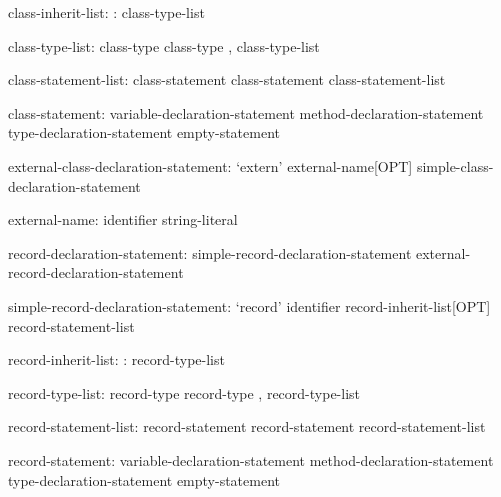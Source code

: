 \begin{syntax}
class-inherit-list:
  : class-type-list
\end{syntax}

\begin{syntax}
class-type-list:
  class-type
  class-type , class-type-list
\end{syntax}

\begin{syntax}
class-statement-list:
  class-statement
  class-statement class-statement-list
\end{syntax}

\begin{syntax}
class-statement:
  variable-declaration-statement
  method-declaration-statement
  type-declaration-statement
  empty-statement
\end{syntax}

\begin{syntax}
external-class-declaration-statement:
  `extern' external-name[OPT] simple-class-declaration-statement
\end{syntax}

\begin{syntax}
external-name:
  identifier
  string-literal
\end{syntax}

\begin{syntax}
record-declaration-statement:
  simple-record-declaration-statement
  external-record-declaration-statement
\end{syntax}

\begin{syntax}
simple-record-declaration-statement:
  `record' identifier record-inherit-list[OPT] { record-statement-list }
\end{syntax}

\begin{syntax}
record-inherit-list:
  : record-type-list
\end{syntax}

\begin{syntax}
record-type-list:
  record-type
  record-type , record-type-list
\end{syntax}

\begin{syntax}
record-statement-list:
  record-statement
  record-statement record-statement-list
\end{syntax}

\begin{syntax}
record-statement:
  variable-declaration-statement
  method-declaration-statement
  type-declaration-statement
  empty-statement
\end{syntax}

